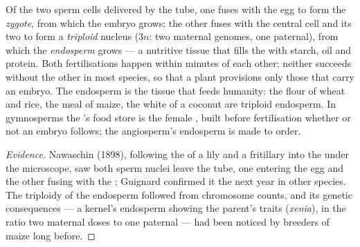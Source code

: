 \begin{proposition}\label{prop:b2:angiosperm-reproduction:double}
Of the two sperm cells delivered by the tube, one fuses with the
egg to form the  \emph{zygote}, from which the embryo grows;
the other fuses with the central cell and its two  to
form a \emph{triploid} nucleus ($3n$: two maternal genomes, one
paternal), from which the \emph{endosperm} grows --- a nutritive
tissue that fills the  with starch, oil and protein. Both
fertilisations happen within minutes of each other; neither
succeeds without the other in most species, so that a plant
provisions only those  that carry an embryo. The endosperm is
the tissue that feeds humanity: the flour of wheat and rice, the
meal of maize, the white of a coconut are triploid endosperm. In
gymnosperms the 's food store is the female , built
before fertilisation whether or not an embryo follows; the
angiosperm's endosperm is made to order.
\end{proposition}
\begin{proof}[Evidence]
Nawaschin (1898), following the  of a lily and a
fritillary into the  under the microscope, saw both sperm
nuclei leave the tube, one entering the egg and the other fusing
with the ; Guignard confirmed it the next year in other
species. The triploidy of the endosperm followed from chromosome
counts, and its genetic consequences --- a kernel's endosperm
showing the  parent's traits (\emph{xenia}), in the ratio two
maternal doses to one paternal --- had been noticed by breeders of
maize long before.
\end{proof}

